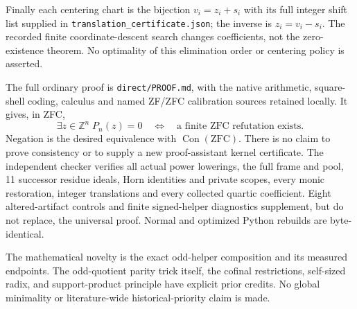 Finally each centering chart is the bijection
$v_i=z_i+s_i$ with its full integer shift list supplied in
\texttt{translation\_certificate.json}; the inverse is $z_i=v_i-s_i$.
The recorded finite coordinate-descent search changes coefficients, not
the zero-existence theorem. No optimality of this elimination order or
centering policy is asserted.

The full ordinary proof is \texttt{direct/PROOF.md}, with the native arithmetic,
square-shell coding, calculus and named ZF/ZFC calibration sources retained
locally. It gives, in ZFC,
\[
 \exists z\in\mathbb Z^n\;P_n(z)=0
 \quad\Longleftrightarrow\quad
 \text{a finite ZFC refutation exists}.
\]
Negation is the desired equivalence with $\operatorname{Con}(\mathrm{ZFC})$.
There is no claim to prove consistency or to supply a new proof-assistant
kernel certificate. The independent checker verifies all actual power
lowerings, the full frame and pool, 11 successor residue ideals, Horn
identities and private scopes, every monic restoration, integer translations
and every collected quartic coefficient. Eight altered-artifact controls and
finite signed-helper diagnostics supplement, but do not replace, the universal
proof. Normal and optimized Python rebuilds are byte-identical.

The mathematical novelty is the exact odd-helper composition and its measured
endpoints. The odd-quotient parity trick itself, the cofinal restrictions,
self-sized radix, and support-product principle have explicit prior credits.
No global minimality or literature-wide historical-priority claim is made.

